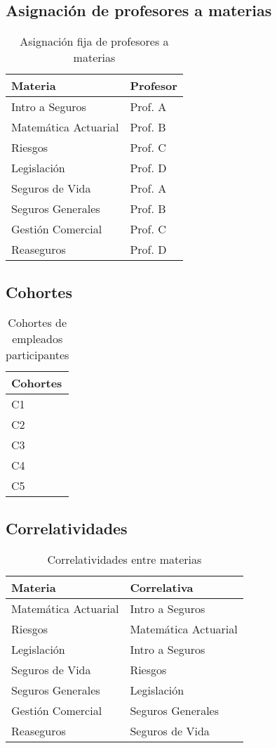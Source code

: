 \subsection*{Asignación de profesores a materias}
\begin{table}[ht]
\centering
\begin{tabular}{|l|l|}
\hline
	\textbf{Materia} & \textbf{Profesor} \\
\hline
Intro a Seguros & Prof. A \\
Matemática Actuarial & Prof. B \\
Riesgos & Prof. C \\
Legislación & Prof. D \\
Seguros de Vida & Prof. A \\
Seguros Generales & Prof. B \\
Gestión Comercial & Prof. C \\
Reaseguros & Prof. D \\
\hline
\end{tabular}
\caption{Asignación fija de profesores a materias}
\end{table}

\subsection*{Cohortes}
\begin{table}[ht]
\centering
\begin{tabular}{|l|}
\hline
	\textbf{Cohortes} \\
\hline
C1 \\
C2 \\
C3 \\
C4 \\
C5 \\
\hline
\end{tabular}
\caption{Cohortes de empleados participantes}
\end{table}

\subsection*{Correlatividades}
\begin{table}[ht]
\centering
\begin{tabular}{|l|l|}
\hline
	\textbf{Materia} & \textbf{Correlativa} \\
\hline
Matemática Actuarial & Intro a Seguros \\
Riesgos & Matemática Actuarial \\
Legislación & Intro a Seguros \\
Seguros de Vida & Riesgos \\
Seguros Generales & Legislación \\
Gestión Comercial & Seguros Generales \\
Reaseguros & Seguros de Vida \\
\hline
\end{tabular}
\caption{Correlatividades entre materias}
\end{table}

